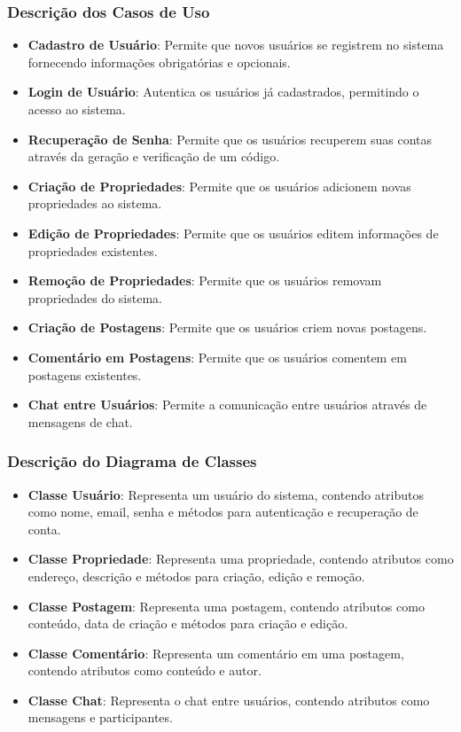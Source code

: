 \documentclass[../main.tex]{subfiles}
\begin{document}
\subsubsection{Descrição dos Casos de Uso}
\begin{itemize}
    \item \textbf{Cadastro de Usuário}: Permite que novos usuários se registrem no sistema fornecendo informações obrigatórias e opcionais.
    \item \textbf{Login de Usuário}: Autentica os usuários já cadastrados, permitindo o acesso ao sistema.
    \item \textbf{Recuperação de Senha}: Permite que os usuários recuperem suas contas através da geração e verificação de um código.
    \item \textbf{Criação de Propriedades}: Permite que os usuários adicionem novas propriedades ao sistema.
    \item \textbf{Edição de Propriedades}: Permite que os usuários editem informações de propriedades existentes.
    \item \textbf{Remoção de Propriedades}: Permite que os usuários removam propriedades do sistema.
    \item \textbf{Criação de Postagens}: Permite que os usuários criem novas postagens.
    \item \textbf{Comentário em Postagens}: Permite que os usuários comentem em postagens existentes.
    \item \textbf{Chat entre Usuários}: Permite a comunicação entre usuários através de mensagens de chat.
\end{itemize}
\subsubsection{Descrição do Diagrama de Classes}
\begin{itemize}
    \item \textbf{Classe Usuário}: Representa um usuário do sistema, contendo atributos como nome, email, senha e métodos para autenticação e recuperação de conta.
    \item \textbf{Classe Propriedade}: Representa uma propriedade, contendo atributos como endereço, descrição e métodos para criação, edição e remoção.
    \item \textbf{Classe Postagem}: Representa uma postagem, contendo atributos como conteúdo, data de criação e métodos para criação e edição.
    \item \textbf{Classe Comentário}: Representa um comentário em uma postagem, contendo atributos como conteúdo e autor.
    \item \textbf{Classe Chat}: Representa o chat entre usuários, contendo atributos como mensagens e participantes.
\end{itemize}
\end{document}
